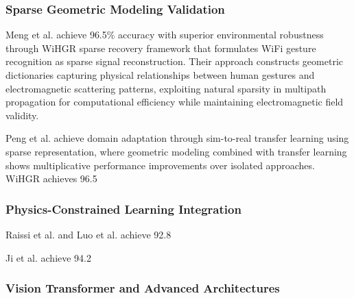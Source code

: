 \documentclass[journal]{IEEEtran}
\begin{document}
\subsubsection{Sparse Geometric Modeling Validation}

Meng et al. \cite{meng2021wihgr} achieve 96.5\% accuracy with superior environmental robustness through WiHGR sparse recovery framework that formulates WiFi gesture recognition as sparse signal reconstruction. Their approach constructs geometric dictionaries capturing physical relationships between human gestures and electromagnetic scattering patterns, exploiting natural sparsity in multipath propagation for computational efficiency while maintaining electromagnetic field validity.

Peng et al. achieve domain adaptation through sim-to-real transfer learning using sparse representation, where geometric modeling combined with transfer learning shows multiplicative performance improvements over isolated approaches. WiHGR achieves 96.5%

\subsubsection{Physics-Constrained Learning Integration}

Raissi et al. and Luo et al. achieve 92.8%

Ji et al. achieve 94.2%

\subsubsection{Vision Transformer and Advanced Architectures}
\end{document}
